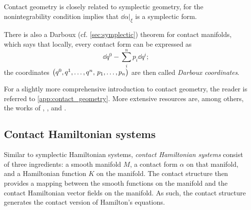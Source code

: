 Contact geometry is closely related to symplectic geometry, for the nonintegrability condition implies that \(\dd{\alpha}\vert_{\xi}\) is a symplectic form. 

There is also a Darboux (cf. \cref{sec:symplectic}) theorem for contact manifolds, which says that locally, every contact form can be expressed as
\begin{equation}
    \dd{q^0} - \sum_i^n p_i \dd{q^i}; 
    \label{eq:contact_darboux}
\end{equation} 
the coordinates \(\qty(q^0, q^1, \ldots, q^n,\, p_1, \ldots, p_n)\) are then called \emph{Darboux coordinates}.

For a slightly more comprehensive introduction to contact geometry, the reader is referred to \cref{app:contact_geometry}. More extensive resources are, among others, the works of \citet{Geiges2008}, \citet{Libermann1987}, \citet{Arnold1989,Arnold1989a} and \citet{Godbillon1969}.

\subsection{Contact Hamiltonian systems}
\label{ssec:contact_ham_systems}
Similar to symplectic Hamiltonian systems, \emph{contact Hamiltonian systems} consist of three ingredients: a smooth manifold \(M\), a contact form \(\alpha\) on that manifold, and a Hamiltonian function \(K\) on the manifold. The contact structure then provides a mapping between the smooth functions on the manifold and the contact Hamiltonian vector fields on the manifold. As such, the contact structure generates the contact version of Hamilton's equations.

